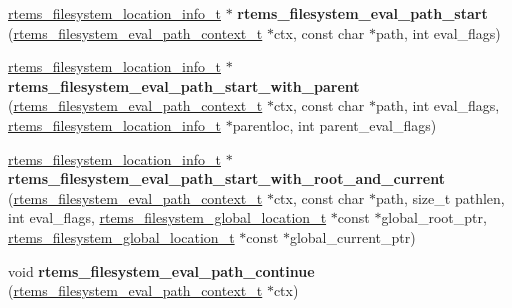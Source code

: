 \begin{DoxyCompactItemize}
\item 
\mbox{\label{group__LibIOInternal_gaa5aa49d164d6bc6f231e793f655e2be2}} 
\mbox{\hyperlink{group__LibIO_ga3252b3d31ee3c49ffff0b7604a676864}{rtems\+\_\+filesystem\+\_\+location\+\_\+info\+\_\+t}} $\ast$ {\bfseries rtems\+\_\+filesystem\+\_\+eval\+\_\+path\+\_\+start} (\mbox{\hyperlink{structrtems__filesystem__eval__path__context__t}{rtems\+\_\+filesystem\+\_\+eval\+\_\+path\+\_\+context\+\_\+t}} $\ast$ctx, const char $\ast$path, int eval\+\_\+flags)
\item 
\mbox{\label{group__LibIOInternal_ga67ccb0573434206617ea7602d86aaedf}} 
\mbox{\hyperlink{group__LibIO_ga3252b3d31ee3c49ffff0b7604a676864}{rtems\+\_\+filesystem\+\_\+location\+\_\+info\+\_\+t}} $\ast$ {\bfseries rtems\+\_\+filesystem\+\_\+eval\+\_\+path\+\_\+start\+\_\+with\+\_\+parent} (\mbox{\hyperlink{structrtems__filesystem__eval__path__context__t}{rtems\+\_\+filesystem\+\_\+eval\+\_\+path\+\_\+context\+\_\+t}} $\ast$ctx, const char $\ast$path, int eval\+\_\+flags, \mbox{\hyperlink{group__LibIO_ga3252b3d31ee3c49ffff0b7604a676864}{rtems\+\_\+filesystem\+\_\+location\+\_\+info\+\_\+t}} $\ast$parentloc, int parent\+\_\+eval\+\_\+flags)
\item 
\mbox{\label{group__LibIOInternal_ga9b379361499c56529d158c30562cf399}} 
\mbox{\hyperlink{group__LibIO_ga3252b3d31ee3c49ffff0b7604a676864}{rtems\+\_\+filesystem\+\_\+location\+\_\+info\+\_\+t}} $\ast$ {\bfseries rtems\+\_\+filesystem\+\_\+eval\+\_\+path\+\_\+start\+\_\+with\+\_\+root\+\_\+and\+\_\+current} (\mbox{\hyperlink{structrtems__filesystem__eval__path__context__t}{rtems\+\_\+filesystem\+\_\+eval\+\_\+path\+\_\+context\+\_\+t}} $\ast$ctx, const char $\ast$path, size\+\_\+t pathlen, int eval\+\_\+flags, \mbox{\hyperlink{structrtems__filesystem__global__location__t}{rtems\+\_\+filesystem\+\_\+global\+\_\+location\+\_\+t}} $\ast$const $\ast$global\+\_\+root\+\_\+ptr, \mbox{\hyperlink{structrtems__filesystem__global__location__t}{rtems\+\_\+filesystem\+\_\+global\+\_\+location\+\_\+t}} $\ast$const $\ast$global\+\_\+current\+\_\+ptr)
\item 
\mbox{\label{group__LibIOInternal_gaa316ec9adf276d998a8a4208be864e13}} 
void {\bfseries rtems\+\_\+filesystem\+\_\+eval\+\_\+path\+\_\+continue} (\mbox{\hyperlink{structrtems__filesystem__eval__path__context__t}{rtems\+\_\+filesystem\+\_\+eval\+\_\+path\+\_\+context\+\_\+t}} $\ast$ctx)

\end{DoxyCompactItemize}
